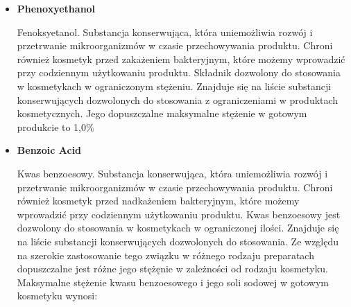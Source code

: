 \begin{itemize}

\item \textbf{Phenoxyethanol}

Fenoksyetanol. Substancja konserwująca, która uniemożliwia rozwój i przetrwanie mikroorganizmów w czasie przechowywania produktu. Chroni również kosmetyk przed zakażeniem bakteryjnym, które możemy wprowadzić przy codziennym użytkowaniu produktu. Składnik dozwolony do stosowania w kosmetykach w ograniczonym stężeniu. Znajduje się na liście substancji konserwujących dozwolonych do stosowania z ograniczeniami w produktach kosmetycznych. Jego dopuszczalne maksymalne stężenie w gotowym produkcie to 1,0\%

\item \textbf{Benzoic Acid}

Kwas benzoesowy. Substancja konserwująca, która uniemożliwia rozwój i przetrwanie mikroorganizmów w czasie przechowywania produktu. Chroni również kosmetyk przed nadkażeniem bakteryjnym, które możemy wprowadzić przy codziennym użytkowaniu produktu. Kwas benzoesowy jest dozwolony do stosowania w kosmetykach w ograniczonej ilości. Znajduje się na liście substancji konserwujących dozwolonych do stosowania. Ze względu na szerokie zastosowanie tego związku w różnego rodzaju preparatach dopuszczalne jest różne jego stężęnie w zależności od rodzaju kosmetyku. Maksymalne stężenie kwasu benzoesowego i jego soli sodowej w gotowym kosmetyku wynosi:


\end{itemize}

